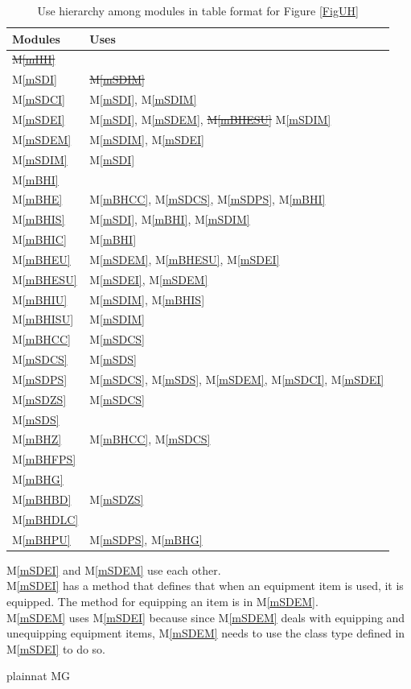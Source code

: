 \documentclass[12pt, titlepage]{article}
\newcommand{\mref}[1]{M\ref{#1}}
\begin{document}
\begin{table}[H]
\centering
\begin{tabular}{p{} p{}}
\toprule
\textbf{Modules} & \textbf{Uses}\\
\midrule
\sout{\mref{mHH}} & ~\\
\mref{mSDI} & \sout{\mref{mSDIM}}\\
\mref{mSDCI} & \mref{mSDI}, \mref{mSDIM}\\
\mref{mSDEI} & \mref{mSDI}, \mref{mSDEM}, \sout{\mref{mBHESU}} {\color{magenta} \mref{mSDIM}}\\
\mref{mSDEM} & \mref{mSDIM}, \mref{mSDEI}\\
\mref{mSDIM} & \mref{mSDI}\\
\mref{mBHI} & ~\\
\mref{mBHE} & \mref{mBHCC}, \mref{mSDCS}, \mref{mSDPS}, \mref{mBHI}\\
\mref{mBHIS} & \mref{mSDI}, \mref{mBHI}, \mref{mSDIM}\\
\mref{mBHIC} & \mref{mBHI}\\
\mref{mBHEU} & \mref{mSDEM}, \mref{mBHESU}, {\color{magenta} \mref{mSDEI}}\\
\mref{mBHESU} & \mref{mSDEI}, \mref{mSDEM}\\
\mref{mBHIU} & \mref{mSDIM}, \mref{mBHIS}\\
\mref{mBHISU} & \mref{mSDIM}\\
\mref{mBHCC} & \mref{mSDCS}\\
\mref{mSDCS} & \mref{mSDS}\\
\mref{mSDPS} & \mref{mSDCS}, \mref{mSDS}, \mref{mSDEM}, \mref{mSDCI}, \mref{mSDEI}\\
\mref{mSDZS} & \mref{mSDCS}\\
\mref{mSDS} & ~\\
\mref{mBHZ} & \mref{mBHCC}, \mref{mSDCS}\\
\mref{mBHFPS} & ~\\
\mref{mBHG} & ~\\
\mref{mBHBD} & \mref{mSDZS}\\
{\color{magenta} \mref{mBHDLC}} & ~\\
{\color{magenta} \mref{mBHPU} }& {\color{magenta} \mref{mSDPS}, \mref{mBHG}}\\
\bottomrule
\end{tabular}
\caption{Use hierarchy among modules in table format for Figure \ref{FigUH}}
\label{TblACT}
\end{table}

{\color{magenta} \mref{mSDEI} and \mref{mSDEM} use each other. \\
\mref{mSDEI} has a method that defines that when an equipment item is used, it is equipped. The method for equipping an item is in \mref{mSDEM}. \\
\mref{mSDEM} uses \mref{mSDEI} because since \mref{mSDEM} deals with equipping and unequipping equipment items, \mref{mSDEM} needs to use the class type defined in \mref{mSDEI} to do so.}


 {plainnat}
 {MG}
\end{document}
